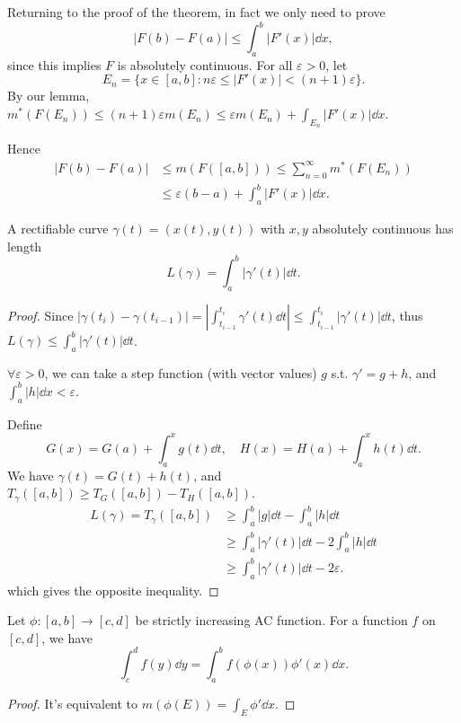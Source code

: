 Returning to the proof of the theorem,
in fact we only need to prove
\[
|F(b) - F(a)|\le \int_{a}^{b} |F'(x)|\dd x,
\]
since this implies $F$ is absolutely continuous.
For all $\varepsilon > 0$, let
\[
	E_n = \{x\in [a,b]: n\varepsilon \le |F'(x)| < (n+1)\varepsilon\}.
\]
By our lemma, $m^*(F(E_n))\le (n+1)\varepsilon m(E_n)\le \varepsilon m(E_n)
+ \int_{E_n} |F'(x)|\dd x$.

Hence
\begin{align*}
	|F(b) - F(a)| &\le m(F([a,b]))
	\le \sum_{n=0}^{\infty} m^*(F(E_n))\\
	&\le \varepsilon(b-a) + \int_{a}^{b} |F'(x)|\dd x.
\end{align*}

\begin{theorem}
    A rectifiable curve $\gamma(t) = (x(t), y(t))$ with $x,y$ absolutely
	continuous has length
	\[
	L(\gamma) = \int_{a}^{b} |\gamma'(t)|\dd t.
	\]
\end{theorem}
\begin{proof}[Proof]
    Since $|\gamma(t_i) - \gamma(t_{i-1})| = |\int_{t_{i-1}}^{t_i} \gamma'(t)\dd t|
	\le \int_{t_{i-1}}^{t_i} |\gamma'(t)|\dd t$,
	thus $L(\gamma)\le \int_{a}^{b} |\gamma'(t)|\dd t$.

	$\forall \varepsilon>0$, we can take a step function (with vector values)
	$g$ s.t. $\gamma' = g + h$, and $\int_{a}^{b} |h|\dd x < \varepsilon$.

	Define
	\[
	G(x) = G(a) + \int_{a}^{x} g(t)\dd t,\quad
	H(x) = H(a) + \int_{a}^{x} h(t)\dd t.
	\]
	We have $\gamma(t) = G(t) + h(t)$,
	and $T_\gamma([a,b])\ge T_G([a,b])-T_H([a,b])$.
	\begin{align*}
		L(\gamma) =
		T_\gamma([a,b]) &\ge \int_{a}^{b} |g|\dd t - \int_{a}^{b} |h|\dd t\\
		&\ge \int_{a}^{b} |\gamma'(t)|\dd t - 2\int_{a}^{b} |h|\dd t\\
		&\ge \int_{a}^{b} |\gamma'(t)|\dd t - 2 \varepsilon.
	\end{align*}
	which gives the opposite inequality.
\end{proof}

\begin{proposition}
	Let $\phi:[a,b]\to [c,d]$ be strictly increasing AC function.
	For a function $f$ on $[c,d]$, we have
	\[
	\int_{c}^{d} f(y)\dd y = \int_{a}^{b} f(\phi(x))\phi'(x) \dd x.
	\]
\end{proposition}
\begin{proof}[Proof]
    It's equivalent to $m(\phi(E)) = \int_E \phi' \dd x$.
\end{proof}

